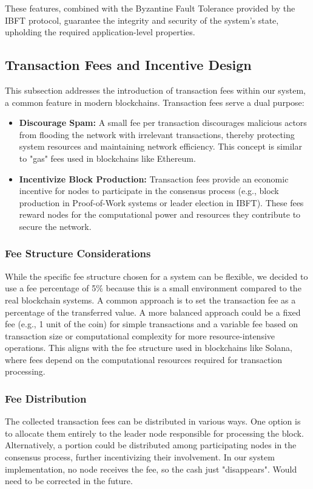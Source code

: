 These features, combined with the Byzantine Fault Tolerance provided by the IBFT protocol, guarantee the integrity and security of the system's state, upholding the required application-level properties.

\subsection{Transaction Fees and Incentive Design}

This subsection addresses the introduction of transaction fees within our system, a common feature in modern blockchains. Transaction fees serve a dual purpose:

\begin{itemize}
    \item \textbf{Discourage Spam:} A small fee per transaction discourages malicious actors from flooding the network with irrelevant transactions, thereby protecting system resources and maintaining network efficiency. This concept is similar to "gas" fees used in blockchains like Ethereum.
    \item \textbf{Incentivize Block Production:} Transaction fees provide an economic incentive for nodes to participate in the consensus process (e.g., block production in Proof-of-Work systems or leader election in IBFT). These fees reward nodes for the computational power and resources they contribute to secure the network.
\end{itemize}

\subsubsection*{Fee Structure Considerations} While the specific fee structure chosen for a system can be flexible, we decided to use a fee percentage of 5\% because this is a small environment compared to the real blockchain systems. A common approach is to set the transaction fee as a percentage of the transferred value. A more balanced approach could be a fixed fee (e.g., 1 unit of the coin) for simple transactions and a variable fee based on transaction size or computational complexity for more resource-intensive operations. This aligns with the fee structure used in blockchains like Solana, where fees depend on the computational resources required for transaction processing.

\subsubsection*{Fee Distribution} The collected transaction fees can be distributed in various ways. One option is to allocate them entirely to the leader node responsible for processing the block. Alternatively, a portion could be distributed among participating nodes in the consensus process, further incentivizing their involvement. In our system implementation, no node receives the fee, so the cash just "disappears". Would need to be corrected in the future.

